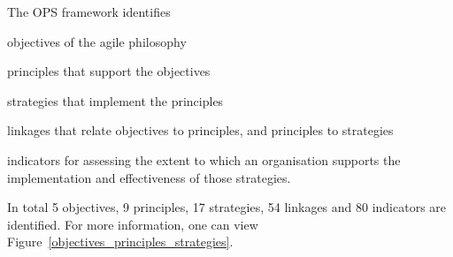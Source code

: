 
The \ac{OPS} framework identifies 
\begin{inparaenum} [a\upshape)]
\item objectives of the agile philosophy
\item principles that support the objectives
\item strategies that implement the principles
\item linkages that relate objectives to
principles, and principles to strategies
\item indicators for assessing the extent to which an organisation supports the implementation and effectiveness of those strategies.
\end{inparaenum}


In total 5 objectives, 9 principles, 17 strategies, 54 linkages and 80 indicators are identified. For more information, one can view  Figure~\ref{objectives_principles_strategies}.

